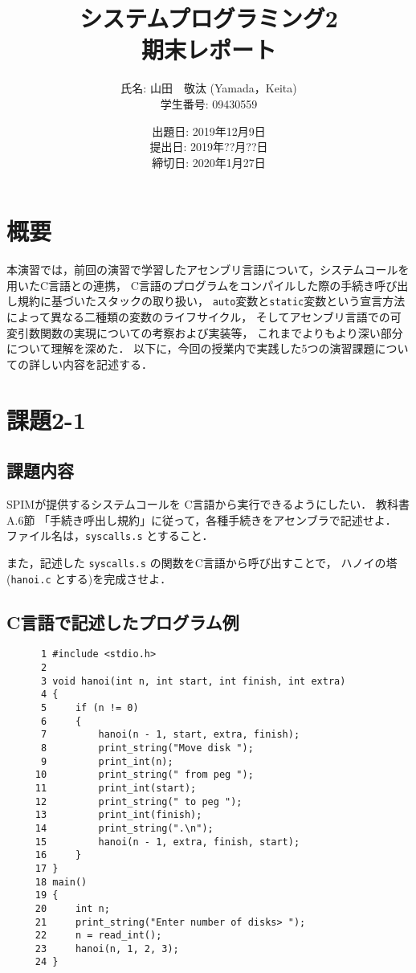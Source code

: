 \documentclass[a4j,11pt]{jarticle}
\title{システムプログラミング2 \\
       期末レポート}
\author{氏名: 山田　敬汰 (Yamada，Keita) \\
        学生番号: 09430559}
\date{出題日: 2019年12月9日 \\   %
      提出日: 2019年??月??日 \\
      締切日: 2020年1月27日 \\}  %
\begin{document}
\maketitle


\section{概要}

本演習では，前回の演習で学習したアセンブリ言語について，システムコールを用いたC言語との連携，
C言語のプログラムをコンパイルした際の手続き呼び出し規約に基づいたスタックの取り扱い，
{\tt auto}変数と{\tt static}変数という宣言方法によって異なる二種類の変数のライフサイクル，
そしてアセンブリ言語での可変引数関数の実現についての考察および実装等，
これまでよりもより深い部分について理解を深めた．
以下に，今回の授業内で実践した5つの演習課題についての詳しい内容を記述する．

\section{課題2-1}
\subsection{課題内容}
SPIMが提供するシステムコールを C言語から実行できるようにしたい． 教科書A.6節 「手続き呼出し規約」に従って，各種手続きをアセンブラで記述せよ． ファイル名は，{\tt syscalls.s} とすること．

また，記述した {\tt syscalls.s} の関数をC言語から呼び出すことで， ハノイの塔({\tt hanoi.c} とする)を完成させよ．

\subsection{C言語で記述したプログラム例}

\begin{verbatim}
      1	#include <stdio.h>
      2	
      3	void hanoi(int n, int start, int finish, int extra)
      4	{
      5	    if (n != 0)
      6	    {
      7	        hanoi(n - 1, start, extra, finish);
      8	        print_string("Move disk ");
      9	        print_int(n);
     10	        print_string(" from peg ");
     11	        print_int(start);
     12	        print_string(" to peg ");
     13	        print_int(finish);
     14	        print_string(".\n");
     15	        hanoi(n - 1, extra, finish, start);
     16	    }
     17	}
     18	main()
     19	{
     20	    int n;
     21	    print_string("Enter number of disks> ");
     22	    n = read_int();
     23	    hanoi(n, 1, 2, 3);
     24	}     
\end{verbatim}
\end{document}
